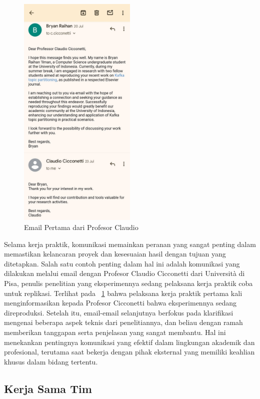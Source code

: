 \begin{figure}
	\centering
	\includegraphics[width=0.5\textwidth]
	{assets/pics/first-email.png}
	\caption{Email Pertama dari Profesor Claudio}
	\label{fig:first-email}
\end{figure}

Selama kerja praktik, komunikasi memainkan peranan yang sangat penting dalam memastikan kelancaran proyek dan kesesuaian hasil dengan tujuan yang ditetapkan. Salah satu contoh penting dalam hal ini adalah komunikasi yang dilakukan melalui email dengan Profesor Claudio Cicconetti dari Università di Pisa, penulis penelitian yang eksperimennya sedang pelaksana kerja praktik coba untuk replikasi. Terlihat pada \pic~\ref{fig:first-email} bahwa pelaksana kerja praktik pertama kali menginformasikan kepada Profesor Cicconetti bahwa eksperimennya sedang direproduksi. Setelah itu, email-email selanjutnya berfokus pada klarifikasi mengenai beberapa aspek teknis dari penelitiannya, dan beliau dengan ramah memberikan tanggapan serta penjelasan yang sangat membantu. Hal ini menekankan pentingnya komunikasi yang efektif dalam lingkungan akademik dan profesional, terutama saat bekerja dengan pihak eksternal yang memiliki keahlian khusus dalam bidang tertentu.

\subsection{Kerja Sama Tim}

